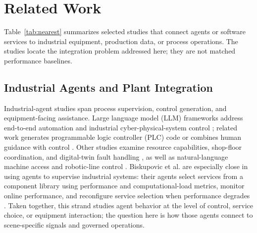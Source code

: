 \section{Related Work}
\label{sec:related}
Table~\ref{tab:nearest} summarizes selected studies that connect agents or
software services to industrial equipment, production data, or process
operations. The studies locate the integration problem addressed here; they
are not matched performance baselines.

\subsection{Industrial Agents and Plant Integration}
Industrial-agent studies span process supervision, control generation, and
equipment-facing assistance. Large language model (LLM) frameworks address
end-to-end automation and industrial cyber-physical-system control
\cite{xia2025control,huang2026made}; related work generates programmable
logic controller (PLC) code or
combines human guidance with control
\cite{liu2026agents4plc,wu2025instructmpc}. Other studies examine resource
capabilities, shop-floor coordination, and digital-twin fault handling
\cite{lim2025llmenabled,zhao2026shopfloor,gill2025llmdt}, as well as
natural-language machine access and robotic-line control
\cite{hofmann2025nlc,waseem2026pretrained}. Biskupovic et al. are especially
close in using agents to supervise industrial systems: their agents select
services from a component library using performance and computational-load
metrics, monitor online performance, and reconfigure service selection when
performance degrades \cite{biskupovic2025supervision}. Taken together, this
strand studies agent behavior at the level of control, service choice, or
equipment interaction; the question here is how those agents connect to
scene-specific signals and governed operations.

